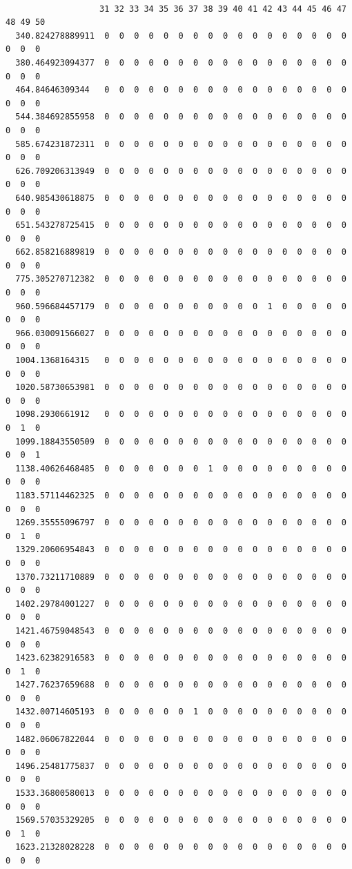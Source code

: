 \documentclass[
  letterpaper,
  DIV=11,
  numbers=noendperiod]{scrartcl}
\begin{document}
\begin{verbatim}
                  
                   31 32 33 34 35 36 37 38 39 40 41 42 43 44 45 46 47 48 49 50
  340.824278889911  0  0  0  0  0  0  0  0  0  0  0  0  0  0  0  0  0  0  0  0
  380.464923094377  0  0  0  0  0  0  0  0  0  0  0  0  0  0  0  0  0  0  0  0
  464.84646309344   0  0  0  0  0  0  0  0  0  0  0  0  0  0  0  0  0  0  0  0
  544.384692855958  0  0  0  0  0  0  0  0  0  0  0  0  0  0  0  0  0  0  0  0
  585.674231872311  0  0  0  0  0  0  0  0  0  0  0  0  0  0  0  0  0  0  0  0
  626.709206313949  0  0  0  0  0  0  0  0  0  0  0  0  0  0  0  0  0  0  0  0
  640.985430618875  0  0  0  0  0  0  0  0  0  0  0  0  0  0  0  0  0  0  0  0
  651.543278725415  0  0  0  0  0  0  0  0  0  0  0  0  0  0  0  0  0  0  0  0
  662.858216889819  0  0  0  0  0  0  0  0  0  0  0  0  0  0  0  0  0  0  0  0
  775.305270712382  0  0  0  0  0  0  0  0  0  0  0  0  0  0  0  0  0  0  0  0
  960.596684457179  0  0  0  0  0  0  0  0  0  0  0  1  0  0  0  0  0  0  0  0
  966.030091566027  0  0  0  0  0  0  0  0  0  0  0  0  0  0  0  0  0  0  0  0
  1004.1368164315   0  0  0  0  0  0  0  0  0  0  0  0  0  0  0  0  0  0  0  0
  1020.58730653981  0  0  0  0  0  0  0  0  0  0  0  0  0  0  0  0  0  0  0  0
  1098.2930661912   0  0  0  0  0  0  0  0  0  0  0  0  0  0  0  0  0  0  1  0
  1099.18843550509  0  0  0  0  0  0  0  0  0  0  0  0  0  0  0  0  0  0  0  1
  1138.40626468485  0  0  0  0  0  0  0  1  0  0  0  0  0  0  0  0  0  0  0  0
  1183.57114462325  0  0  0  0  0  0  0  0  0  0  0  0  0  0  0  0  0  0  0  0
  1269.35555096797  0  0  0  0  0  0  0  0  0  0  0  0  0  0  0  0  0  0  1  0
  1329.20606954843  0  0  0  0  0  0  0  0  0  0  0  0  0  0  0  0  0  0  0  0
  1370.73211710889  0  0  0  0  0  0  0  0  0  0  0  0  0  0  0  0  0  0  0  0
  1402.29784001227  0  0  0  0  0  0  0  0  0  0  0  0  0  0  0  0  0  0  0  0
  1421.46759048543  0  0  0  0  0  0  0  0  0  0  0  0  0  0  0  0  0  0  0  0
  1423.62382916583  0  0  0  0  0  0  0  0  0  0  0  0  0  0  0  0  0  0  1  0
  1427.76237659688  0  0  0  0  0  0  0  0  0  0  0  0  0  0  0  0  0  0  0  0
  1432.00714605193  0  0  0  0  0  0  1  0  0  0  0  0  0  0  0  0  0  0  0  0
  1482.06067822044  0  0  0  0  0  0  0  0  0  0  0  0  0  0  0  0  0  0  0  0
  1496.25481775837  0  0  0  0  0  0  0  0  0  0  0  0  0  0  0  0  0  0  0  0
  1533.36800580013  0  0  0  0  0  0  0  0  0  0  0  0  0  0  0  0  0  0  0  0
  1569.57035329205  0  0  0  0  0  0  0  0  0  0  0  0  0  0  0  0  0  0  1  0
  1623.21328028228  0  0  0  0  0  0  0  0  0  0  0  0  0  0  0  0  0  0  0  0

\end{verbatim}
\end{document}
